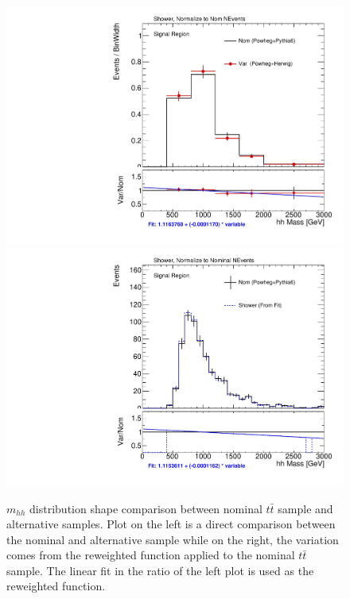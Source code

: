\begin{figure}[!htbp]
\begin{center}
\includegraphics[scale=0.33]{./figures/boosted/systematics/ttbar_alt_hhMass_SR_Shower_rebin}
\includegraphics[scale=0.33]{./figures/boosted/systematics/ttbar_fromfit_hhMass_SR_Shower}   \\
\caption[$m_{hh}$ distribution shape comparison between nominal $t\bar{t}$ sample and alternative samples]{$m_{hh}$ distribution shape comparison between nominal $t\bar{t}$ sample and alternative samples. Plot on the left is a direct
comparison between the nominal and alternative sample while on the right, the variation comes from the reweighted function applied to
the nominal $t\bar{t}$ sample. The linear fit in the ratio of the left plot is used as the reweighted function.}
\label{fig:boosted_unc_ttbar_shape_sr}
\end{center}
\end{figure}
 
